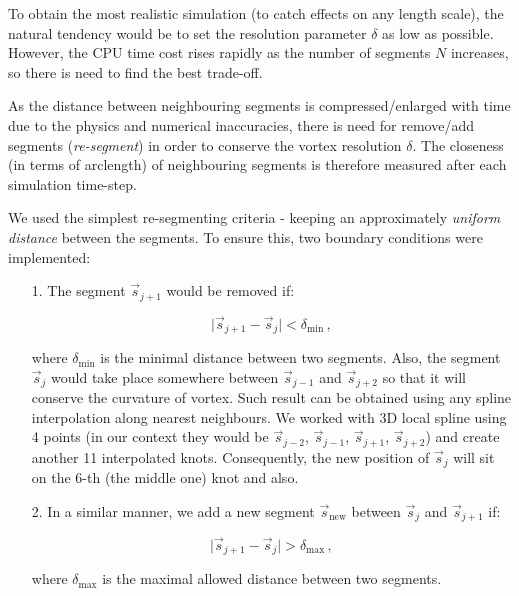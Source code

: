 To obtain the most realistic simulation (to catch effects on any length scale), the natural tendency would be to set the resolution parameter $\delta$ as low as possible. However, the CPU time cost rises rapidly as the number of segments $N$ increases, so there is need to find the best trade-off.

As the distance between neighbouring segments is compressed/enlarged with time due to the physics and numerical inaccuracies, there is need for remove/add segments (\textit{re-segment}) in order to conserve the vortex resolution $\delta$. The closeness (in terms of arclength) of neighbouring segments is therefore measured after each simulation time-step.

We used the simplest re-segmenting criteria - keeping an approximately \textit{uniform distance} between the segments. To ensure this, two boundary conditions were implemented:

\begin{itemize}
	\item[1.] The segment $\vec{s}_{j+1}$ would be removed if:

	\begin{equation}
	\vert \vec{s}_{j+1} - \vec{s}_j \vert < \delta_{\text{min}}\,,
	\end{equation}

	where $\delta_{\text{min}}$ is the minimal distance between two segments. Also, the segment $\vec{s}_j$ would take place somewhere between $\vec{s}_{j-1}$ and $\vec{s}_{j+2}$ so that it will conserve the curvature of vortex. Such result can be obtained using any spline interpolation along nearest neighbours. We worked with 3D local spline using 4 points (in our context they would be $\vec{s}_{j-2}$, $\vec{s}_{j-1}$, $\vec{s}_{j+1}$, $\vec{s}_{j+2}$) and create another 11 interpolated knots.
	Consequently, the new position of $\vec{s}_j$ will sit on the 6-th (the middle one) knot and also.

	\item[2.] In a similar manner, we add a new segment $\vec{s}_{\text{new}}$ between $\vec{s}_{j}$ and $\vec{s}_{j+1}$ if:

	\begin{equation}
	\vert \vec{s}_{j+1} - \vec{s}_j \vert > \delta_{\text{max}}\,,
	\end{equation}

	where $\delta_{\text{max}}$ is the maximal allowed distance between two segments.
\end{itemize}

